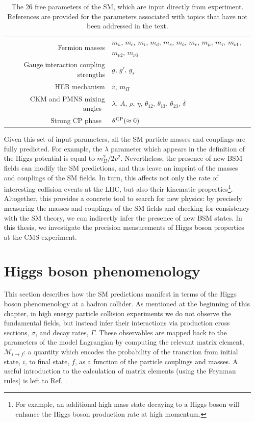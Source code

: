 \begin{table}[htb]
    \caption[The free parameters of the SM]{The 26 free parameters of the SM, which are input directly from experiment. References are provided for the parameters associated with topics that have not been addressed in the text.}
    \label{tab:sm_freeparams}
    \centering
    \footnotesize
    \renewcommand{\arraystretch}{2}
    \begin{tabular}{r|l}
       Fermion masses & $m_u$, $m_c$, $m_t$, $m_d$, $m_s$, $m_b$, $m_e$, $m_\mu$, $m_\tau$, $m_{{\nu}1}$, $m_{{\nu}2}$, $m_{{\nu}3}$ \\
       Gauge interaction coupling strengths & $g$, $g'$, $g_s$ \\
       HEB mechanism & $v$, $m_H$ \\
       CKM and PMNS mixing angles~\cite{Cabibbo:1963yz,Kobayashi:1973fv,Pontecorvo:1957qd,Maki:1962mu} & $\lambda$, $A$, $\rho$, $\eta$, $\theta_{12}$, $\theta_{13}$, $\theta_{23}$, $\delta$  \\
       Strong CP phase~\cite{strongcp} & $\theta^{\rm{CP}}(\approx0)$\\
    \end{tabular}
\end{table}

Given this set of input parameters, all the SM particle masses and couplings are fully predicted. For example, the $\lambda$ parameter which appears in the definition of the Higgs potential is equal to $m_H^2/2v^2$. Nevertheless, the presence of new BSM fields can modify the SM predictions, and thus leave an imprint of the masses and couplings of the SM fields. In turn, this affects not only the rate of interesting collision events at the LHC, but also their kinematic properties\footnote{For example, an additional high mass state decaying to a Higgs boson will enhance the Higgs boson production rate at high momentum.}. Altogether, this provides a concrete tool to search for new physics: by precisely measuring the masses and couplings of the SM fields and checking for consistency with the SM theory, we can indirectly infer the presence of new BSM states. In this thesis, we investigate the precision measurements of Higgs boson properties at the CMS experiment.

\section{Higgs boson phenomenology}
This section describes how the SM predictions manifest in terms of the Higgs boson phenomenology at a hadron collider. As mentioned at the beginning of this chapter, in high energy particle collision experiments we do not observe the fundamental fields, but instead infer their interactions via production cross sections, $\sigma$, and decay rates, $\Gamma$. These observables are mapped back to the parameters of the model Lagrangian by computing the relevant matrix element, $\mathcal{M}_{i \rightarrow f}$: a quantity which encodes the probability of the transition from initial state, $i$, to final state, $f$, as a function of the particle couplings and masses. A useful introduction to the calculation of matrix elements (using the Feynman rules) is left to Ref.~\cite{Thomson:2013zua}. 


